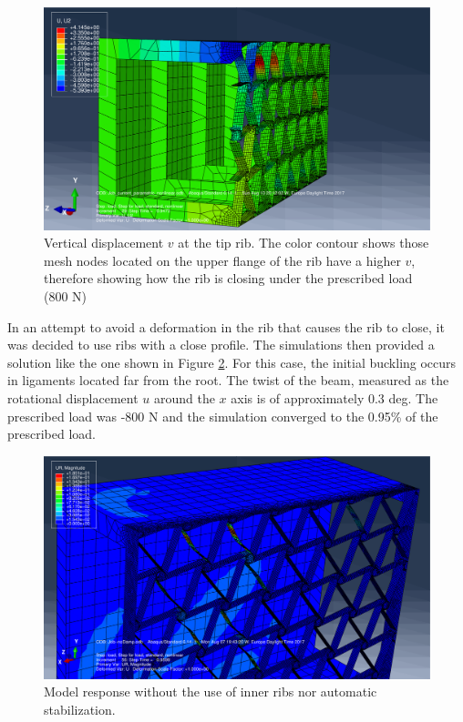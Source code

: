     \begin{figure}[!htpb]
      \centering
      \includegraphics[width=0.8 \textwidth]{../figures/result-model/closeOfRib-800N}
      \caption[Vertical displacement $v$ at the tip rib]{Vertical displacement $v$ at the tip rib. The color contour shows those mesh nodes located on the upper flange of the rib have a higher $v$, therefore showing how the rib is closing under the prescribed load (800 N)}\label{fig:closeOfRib-800N}
    \end{figure}

    In an attempt to avoid a deformation in the rib that causes the rib to close, it was decided to use ribs with a close profile. The simulations then provided a solution like the one shown in Figure \ref{fig:normalCaseNoDampNoInnerRibs_800N}. For this case, the initial buckling occurs in ligaments located far from the root. The twist of the beam, measured as the rotational displacement $u$ around the $x$ axis is of approximately 0.3 deg. The prescribed load was -800 N and the simulation converged to the 0.95\% of the prescribed load.

    \begin{figure}[!htpb]
      \centering
      \includegraphics[width=0.8 \textwidth]{../figures/result-model/normalCaseNoDampNoInnerRibs_800N}
      \caption[Model response without the use of inner ribs nor automatic stabilization]{Model response without the use of inner ribs nor automatic stabilization.}\label{fig:normalCaseNoDampNoInnerRibs_800N}
    \end{figure}

